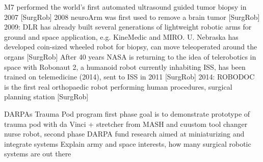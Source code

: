 M7 performed the world's first automated ultrasound guided tumor biopsy in 2007 [SurgRob]
2008 neuroArm was first used to remove a brain tumor [SurgRob]
2009: DLR has already built several generations of lightweight robotic arms for ground and space application, e.g. KineMedic and MIRO. U. Nebraska has developed coin-sized wheeled robot for biopsy, can move teleoperated around the organs [SurgRob]
After 40 years NASA is returning to the idea of telerobotics in space with Robonaut 2, a humanoid robot currently inhabiting ISS, has been trained on telemedicine (2014), sent to ISS in 2011 [SurgRob]
2014: ROBODOC is the first real orthopaedic robot performing human procedures, surgical planning station [SurgRob]

DARPAs Trauma Pod program first phase goal is to demonstrate prototype of trauma pod with da Vinci + stretcher from MASH and cuustom tool changer nurse robot, second phase DARPA fund research aimed at miniaturizing and integrate systems \citep{bib:docatadist}
Explain army and space interests, how many surgical robotic systems are out there



